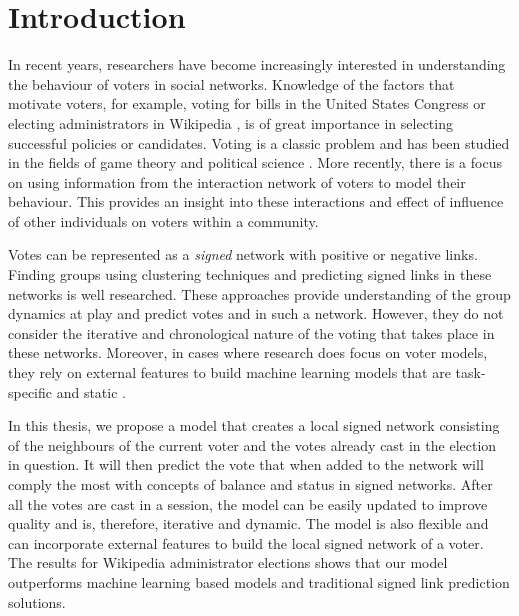 \chapter{Introduction}



In recent years, researchers have become increasingly interested in understanding the behaviour of voters in social networks. Knowledge of the factors that motivate voters, for example, voting for bills in the United States Congress \cite{karimi2019multicongress} or electing administrators in Wikipedia \cite{jankowski-lorek2013MBSN,cabunducan2011voting,lee2012uncovering}, is of great importance in selecting successful policies or candidates. Voting is a classic problem and has been studied in the fields of game theory and political science \cite{zou2015strategicDoodle,kearns2009behavioral,tal2015a}. More recently, there is a focus on using information from the interaction network of voters to model their behaviour. This provides an insight into these interactions and effect of influence of other individuals on voters within a community.

Votes can be represented as a \textit{signed} network with positive or negative links. Finding groups using clustering techniques \cite{brito2020aBrazil,levorato2016brazilian,chiang2014prediction} and predicting signed links \cite{leskovec2010predicting,leskovec2010signed,chiang2011exploiting} in these networks is well researched. These approaches provide understanding of the group dynamics at play and predict votes and in such a network. However, they do not consider the iterative and chronological nature of the voting that takes place in these networks. Moreover, in cases where research does focus on voter models, they rely on external features to build machine learning models that are task-specific and static \cite{karimi2019multicongress,jankowski-lorek2013MBSN}.

In this thesis, we propose a model that creates a local signed network consisting of the neighbours of the current voter and the votes already cast in the election in question. It will then predict the vote that when added to the network will comply the most with concepts of balance and status in signed networks. After all the votes are cast in a session, the model can be easily updated to improve quality and is, therefore, iterative and dynamic. The model is also flexible and can incorporate external features to build the local signed network of a voter. The results for Wikipedia administrator elections shows that our model outperforms machine learning based models and traditional signed link prediction solutions. 

